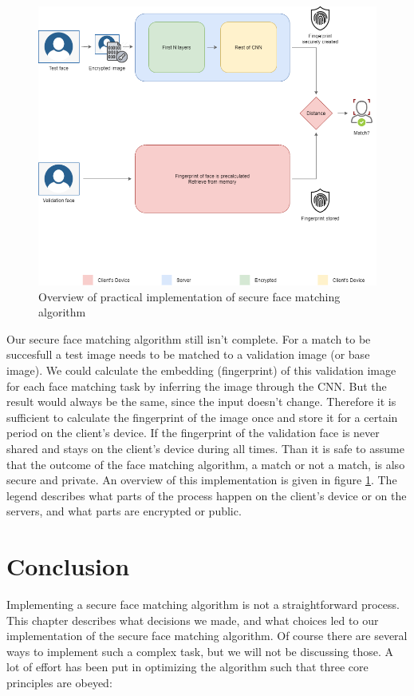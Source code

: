 \begin{figure}[H]
  \includegraphics[scale=0.5]{fig/implementation_overview.png}
  \centering
  \caption{Overview of practical implementation of secure face matching algorithm}
  \label{fig:implementation_overview}
\end{figure}

Our secure face matching algorithm still isn't complete. For a match to be succesfull a test image needs to be matched to a validation image (or base image). We could calculate the embedding (fingerprint) of this validation image for each face matching task by inferring the image through the CNN. But the result would always be the same, since the input doesn't change. Therefore it is sufficient to calculate the fingerprint of the image once and store it for a certain period on the client's device. If the fingerprint of the validation face is never shared and stays on the client's device during all times. Than it is safe to assume that the outcome of the face matching algorithm, a match or not a match, is also secure and private. An overview of this implementation is given in figure \ref{fig:implementation_overview}. The legend describes what parts of the process happen on the client's device or on the servers, and what parts are encrypted or public.

\section{Conclusion}
Implementing a secure face matching algorithm is not a straightforward process. This chapter describes what decisions we made, and what choices led to our implementation of the secure face matching algorithm. Of course there are several ways to implement such a complex task, but we will not be discussing those. A lot of effort has been put in optimizing the algorithm such that three core principles are obeyed:

